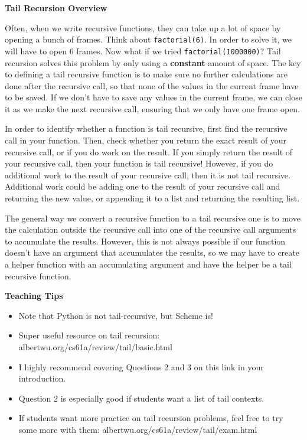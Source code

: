 \textbf{Tail Recursion Overview }

Often, when we write recursive functions, they can take up a lot of space by opening a bunch of frames. Think about \texttt{factorial(6)}. In order to solve it, we will have to open 6 frames. Now what if we tried \texttt{factorial(1000000)}? Tail recursion solves this problem by only using a \textbf{constant} amount of space. The key to defining a tail recursive function is to make sure no further calculations are done after the recursive call, so that none of the values in the current frame have to be saved. If we don’t have to save any values in the current frame, we can close it as we make the next recursive call, ensuring that we only have one frame open.

In order to identify whether a function is tail recursive, first find the recursive call in your function. Then, check whether you return the exact result of your recursive call, or if you do work on the result. If you simply return the result of your recursive call, then your function is tail recursive! However, if you do additional work to the result of your recursive call, then it is not tail recursive. Additional work could be adding one to the result of your recursive call and returning the new value, or appending it to a list and returning the resulting list.

The general way we convert a recursive function to a tail recursive one is to move the calculation outside the recursive call into one of the recursive call arguments to accumulate the results. However, this is not always possible if our function doesn’t have an argument that accumulates the results, so we may have to create a helper function with an accumulating argument and have the helper be a tail recursive function.

\begin{guide}
\begin{blocksection}
\textbf{Teaching Tips}
  \begin{itemize}
    \item Note that Python is not tail-recursive, but Scheme is!
    \item Super useful resource on tail recursion: albertwu.org/cs61a/review/tail/basic.html
    \item I highly recommend covering Questions 2 and 3 on this link in your introduction.
    \item Question 2 is especially good if students want a list of tail contexts.
    \item If students want more practice on tail recursion problems, feel free to try some more with them: albertwu.org/cs61a/review/tail/exam.html
  \end{itemize}
\end{blocksection}
\end{guide}
